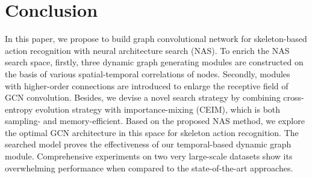 \documentclass[letterpaper]{article} \usepackage{aaai19}  \usepackage{times}  \usepackage{helvet} \usepackage{courier}  \usepackage[hyphens]{url}  \usepackage{graphicx} \urlstyle{rm} \def\UrlFont{\rm}  \usepackage{graphicx}  \frenchspacing  \setlength{\pdfpagewidth}{8.5in}  \setlength{\pdfpageheight}{11in}
\begin{document}
\begin{table}[h]\footnotesize
\begin{center}
\vspace{-1em}
\caption{\small{Performance comparison on Kinetics with eight current state-of-the-art methods.}} 


\label{tab:Kinetics}
\end{center}
\vspace{-2em}

\end{table}







\section{Conclusion}
In this paper, we propose to build graph convolutional network for skeleton-based action recognition with neural architecture search (NAS). To enrich the NAS search space, firstly, three dynamic graph generating modules are constructed on the basis of various spatial-temporal correlations of nodes. Secondly, modules with higher-order connections are introduced to enlarge the receptive field of GCN convolution. Besides, we devise a novel search strategy by combining cross-entropy evolution strategy with importance-mixing (CEIM), which is both sampling- and memory-efficient. Based on the proposed NAS method, we explore the optimal GCN architecture in this space for skeleton action recognition. The searched model proves the effectiveness of our temporal-based dynamic graph module. Comprehensive experiments on two very large-scale datasets show its overwhelming performance when compared to the state-of-the-art approaches.





\end{document}

